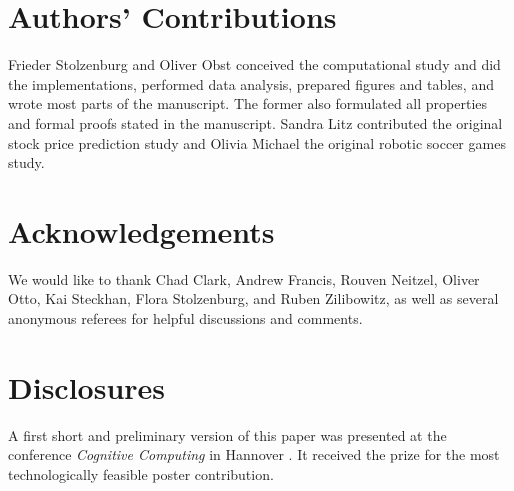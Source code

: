 \documentclass[sn-mathphys-num]{sn-jnl}
\begin{document}
\section*{Authors' Contributions}
Frieder Stolzenburg and Oliver Obst conceived the computational study and did
the implementations, performed data analysis, prepared figures and tables, and
wrote most parts of the manuscript. The former also formulated all properties
and formal proofs stated in the manuscript. Sandra Litz contributed the original
stock price prediction study and Olivia Michael the original robotic soccer
games study.

\section*{Acknowledgements}
We would like to thank Chad Clark, Andrew Francis, Rouven Neitzel, Oliver Otto,
Kai Steckhan, Flora Stolzenburg, and Ruben Zilibowitz, as well as several
anonymous referees for helpful discussions and comments. 

\section*{Disclosures}
A first short and preliminary version of this paper was presented at the conference
\emph{Cognitive Computing} in Hannover \citep{SMO18}. It received the prize for the
most technologically feasible poster contribution.


\end{document}
